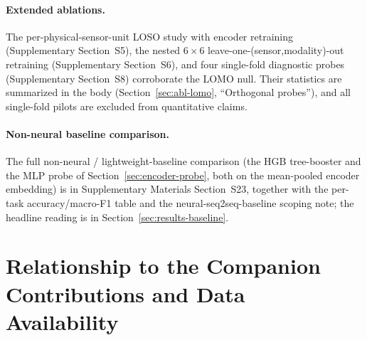 \documentclass[sensors,article,submit,moreauthors,pdftex]{Definitions/mdpi}
\begin{document}
\paragraph{Extended ablations.}\label{app:extended-ablations} The per-physical-sensor-unit LOSO study with encoder retraining (Supplementary Section~S5), the nested $6\!\times\!6$ leave-one-(sensor,modality)-out retraining (Supplementary Section~S6), and four single-fold diagnostic probes (Supplementary Section~S8) corroborate the LOMO null. Their statistics are summarized in the body (Section~\ref{sec:abl-lomo}, ``Orthogonal probes''), and all single-fold pilots are excluded from quantitative claims.

\paragraph{Non-neural baseline comparison.}\label{app:baselines} The full non-neural / lightweight-baseline comparison (the HGB tree-booster and the MLP probe of Section~\ref{sec:encoder-probe}, both on the mean-pooled encoder embedding) is in Supplementary Materials Section~S23, together with the per-task accuracy/macro-F1 table and the neural-seq2seq-baseline scoping note; the headline reading is in Section~\ref{sec:results-baseline}.

\section{Relationship to the Companion Contributions and Data Availability}
\label{app:companion}
\end{document}
